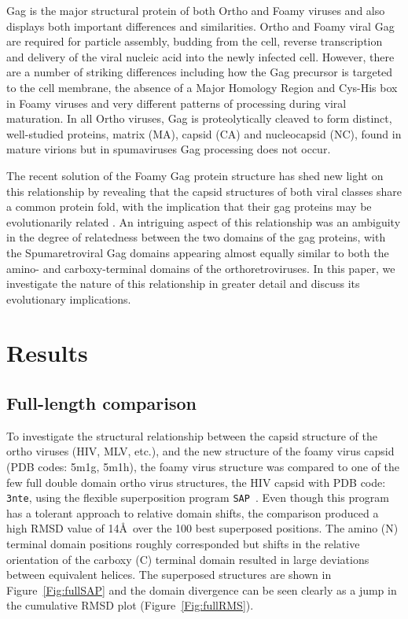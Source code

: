 \documentclass[12pt]{article}
\newcommand{\Fig}[1]{Figure~\ref{Fig:#1}}
\newcommand{\3}{$3_{10}$}
\newcommand{\SAP}{{\tt SAP}}
\begin{document}
Gag is the major structural protein of both Ortho and Foamy viruses and also displays both important differences and similarities.
Ortho and Foamy viral Gag are required for particle assembly, budding from the cell, reverse transcription and delivery of the
viral nucleic acid into the newly infected cell. However, there are a number of striking differences including how the Gag
precursor is targeted to the cell membrane, the absence of a Major Homology Region and Cys-His box in Foamy viruses and very 
different patterns of processing during viral maturation. In all Ortho viruses, Gag is proteolytically cleaved to form distinct, 
well-studied proteins, matrix (MA), capsid (CA) and nucleocapsid (NC), found in mature virions but in spumaviruses Gag processing 
does not occur. 

The recent solution of the Foamy Gag protein structure has shed new light on this relationship by revealing that
the capsid structures of both viral classes share a common protein fold, with the implication that their gag proteins may
be evolutionarily related \cite{BallNJet16}.   An intriguing aspect of this relationship was an ambiguity in the degree of
relatedness between the two domains of the gag proteins, with the Spumaretroviral Gag domains appearing almost equally
similar to both the amino- and carboxy-terminal domains of the orthoretroviruses.   In this paper, we investigate the
nature of this relationship in greater detail and discuss its evolutionary implications. 
\clearpage
%
\section{Results}

\subsection{Full-length comparison}

To investigate the structural relationship between the capsid structure of the ortho viruses (HIV, MLV, etc.),
and the new structure of the foamy virus capsid \cite{BallNJet16} (PDB codes: 5m1g, 5m1h), the foamy virus structure was
compared to one of the few full double domain ortho virus structures, the HIV capsid with PDB code: {\tt 3nte},
using the flexible superposition program \SAP\ \cite{TaylorWR99a}.   Even though this program has a tolerant approach
to relative domain shifts, the comparison produced a high RMSD value of 14\AA\ over the 100 best superposed
positions.   The amino (N) terminal domain positions roughly corresponded but shifts in the relative
orientation of the carboxy (C) terminal domain resulted in large deviations between equivalent helices.  
The superposed structures are shown in \Fig{fullSAP} and the domain divergence can be seen clearly as a
jump in the cumulative RMSD plot (\Fig{fullRMS}).
\end{document}

